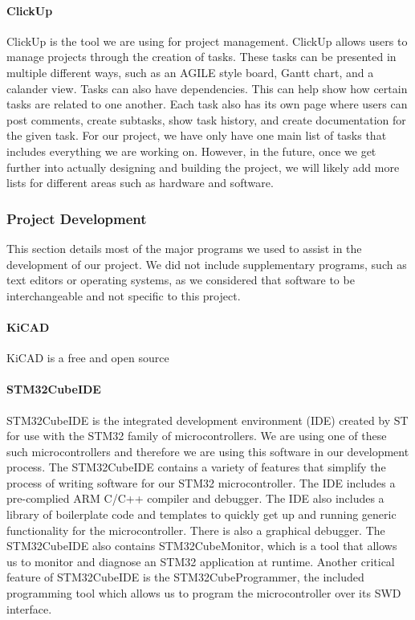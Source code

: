 \paragraph{ClickUp}
ClickUp is the tool we are using for project management. ClickUp allows users to manage projects through the creation of tasks. These tasks can be presented in multiple different ways, such as an AGILE style board, Gantt chart, and a calander view. Tasks can also have dependencies. This can help show how certain tasks are related to one another. Each task also has its own page where users can post comments, create subtasks, show task history, and create documentation for the given task. For our project, we have only have one main list of tasks that includes everything we are working on. However, in the future, once we get further into actually designing and building the project, we will likely add more lists for different areas such as hardware and software.

\subsubsection{Project Development}
This section details most of the major programs we used to assist in the development of our project. We did not include supplementary programs, such as text editors or operating systems, as we considered that software to be interchangeable and not specific to this project.

\paragraph{KiCAD}
KiCAD is a free and open source 

\paragraph{STM32CubeIDE}
STM32CubeIDE is the integrated development environment (IDE) created by ST for use with the STM32 family of microcontrollers. We are using one of these such microcontrollers and therefore we are using this software in our development process. The STM32CubeIDE contains a variety of features that simplify the process of writing software for our STM32 microcontroller. The IDE includes a pre-complied ARM C/C++ compiler and debugger. The IDE also includes a library of boilerplate code and templates to quickly get up and running generic functionality for the microcontroller. There is also a graphical debugger. The STM32CubeIDE also contains STM32CubeMonitor, which is a tool that allows us to monitor and diagnose an STM32 application at runtime. Another critical feature of STM32CubeIDE is the STM32CubeProgrammer, the included programming tool which allows us to program the microcontroller over its SWD interface.

